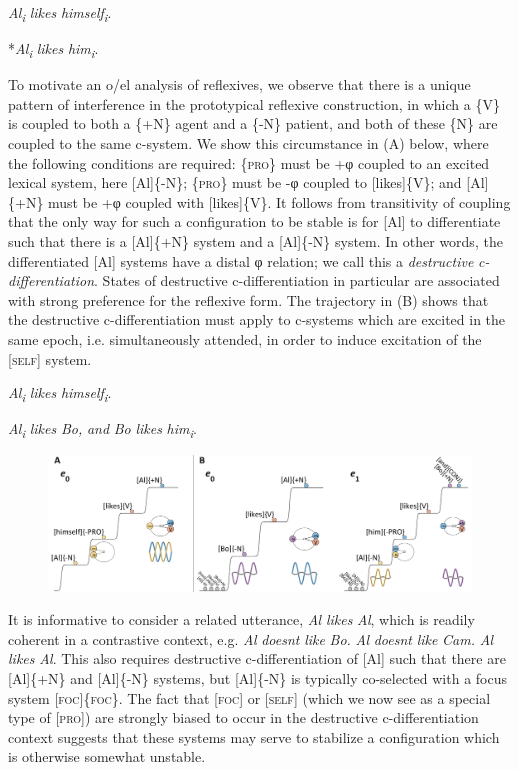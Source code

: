 \textit{Al\textsubscript{i}} \textit{likes} \textit{himself\textsubscript{i}}.      

*\textit{Al\textsubscript{i}} \textit{likes} \textit{him\textsubscript{i}}.        

  To motivate an o/el analysis of reflexives, we observe that there is a unique pattern of interference in the prototypical reflexive construction, in which a \{V\} is coupled to both a \{+N\} agent and a \{-N\} patient, and both of these \{N\} are coupled to the same c-system. We show this circumstance in (A) below, where the following conditions are required: \{\textsc{pro}\} must be +φ coupled to an excited lexical system, here [Al]\{-N\}; \{\textsc{pro}\} must be -φ coupled to [likes]\{V\}; and [Al]\{+N\} must be +φ coupled with [likes]\{V\}. It follows from transitivity of coupling that the only way for such a configuration to be stable is for [Al] to differentiate such that there is a [Al]\{+N\} system and a [Al]\{-N\} system. In other words, the differentiated [Al] systems have a distal φ relation; we call this a \textit{destructive} \textit{c-differentiation}. States of destructive c-differentiation in particular are associated with strong preference for the reflexive form. The trajectory in (B) shows that the destructive c-differentiation must apply to c-systems which are excited in the same epoch, i.e. simultaneously attended, in order to induce excitation of the [\textsc{self}] system. 

    \textit{Al\textsubscript{i}} \textit{likes} \textit{himself\textsubscript{i}}.  

    \textit{Al\textsubscript{i}} \textit{likes} \textit{Bo,} \textit{and} \textit{Bo} \textit{likes} \textit{him\textsubscript{i}}.  

  
\begin{figure}
\includegraphics[width=\textwidth]{figures/Tilsen-img156.png}
\caption{\missingcaption}
\label{fig:}
\end{figure}
 

  It is informative to consider a related utterance, \textit{Al} \textit{likes} \textit{Al}, which is readily coherent in a contrastive context, e.g. \textit{Al} \textit{doesnt} \textit{like} \textit{Bo.} \textit{Al} \textit{doesnt} \textit{like} \textit{Cam.} \textit{Al} \textit{likes} \textit{Al}. This also requires destructive c-differentiation of [Al] such that there are [Al]\{+N\} and [Al]\{-N\} systems, but [Al]\{-N\} is typically co-selected with a focus system [\textsc{foc}]\{\textsc{foc}\}. The fact that [\textsc{foc}] or [\textsc{self}] (which we now see as a special type of [\textsc{pro}]) are strongly biased to occur in the destructive c-differentiation context suggests that these systems may serve to stabilize a configuration which is otherwise somewhat unstable.

